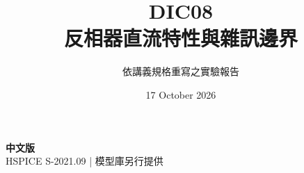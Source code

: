 \documentclass[11pt,a4paper]{article}
\title{\color{accent}DIC08\\[4pt]反相器直流特性與雜訊邊界}
\author{依講義規格重寫之實驗報告}
\date{17 October 2026}
\begin{document}
\maketitle
\begin{center}\small\textbf{中文版}\\
HSPICE S-2021.09 \quad | \quad 模型庫另行提供
\end{center}


\end{document}
